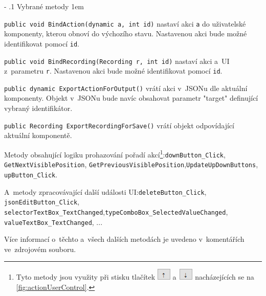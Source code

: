 \documentclass[12pt, a4paper, twoside]{article}
\makeatletter
\newenvironment{methods}{
	\parindent0pt
	\parskip1em
	\vspace{-0.8em}
}{}
\renewcommand\paragraph{%
	\@startsection{subparagraph}{5}{0mm}%
	{-\baselineskip}%
	{.1\baselineskip}%
	{\normalfont\normalsize\bfseries}}
\makeatother
\begin{document}
	\paragraph{Vybrané metody}
	\begin{methods}
		\lstinline[style=MyCSharpDocs]|public void BindAction(dynamic a, int id)| nastaví akci \lstinline|a| do uživatelské komponenty, kterou obnoví do výchozího stavu. Nastavenou akci bude možné identifikovat pomocí \lstinline|id|.
		
		\lstinline[style=MyCSharpDocs]|public void BindRecording(Recording r, int id)| nastaví akci a~UI z~parametru \lstinline|r|. Nastavenou akci bude možné identifikovat pomocí \lstinline|id|.
		
		\lstinline[style=MyCSharpDocs]|public dynamic ExportActionForOutput()| vrátí akci v~JSONu dle aktuální komponenty. Objekt v~JSONu bude navíc obsahovat parametr "target" definující vybraný identifikátor.
		
		\lstinline[style=MyCSharpDocs]|public Recording ExportRecordingForSave()| vrátí objekt odpovídající aktuální komponentě.
		
		Metody obsahující logiku prohazování pořadí akcí\footnote{Tyto metody jsou využity při stisku tlačítek \includegraphics{upArrow.png} a~\includegraphics{downArrow.png} nacházejících se na \cref{fig:actionUserControl}.}:\newline\lstinline|downButton_Click|, \lstinline|GetNextVisiblePosition|, \lstinline|GetPreviousVisiblePosition|,\linebreak\lstinline|UpdateUpDownButtons|, \lstinline|upButton_Click|.
		
		A~metody zpracovávající další události UI:\newline \lstinline|deleteButton_Click|, \lstinline|jsonEditButton_Click|, \lstinline|selectorTextBox_TextChanged|,\linebreak \lstinline|typeComboBox_SelectedValueChanged|, \lstinline|valueTextBox_TextChanged|, ...
		
		Více informací o~těchto a~všech dalších metodách je uvedeno v~komentářích ve~zdrojovém souboru.
		
		
	\end{methods}
	
\end{document}
